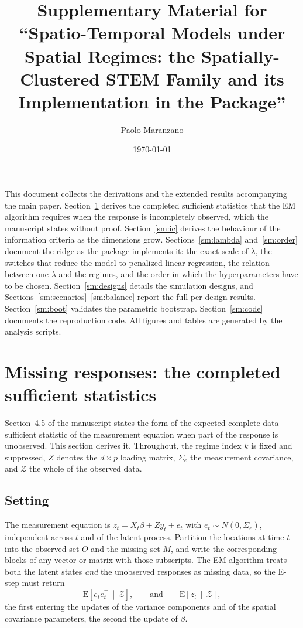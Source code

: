 \documentclass[11pt]{article}
\title{Supplementary Material for\\
       ``Spatio-Temporal Models under Spatial Regimes: the Spatially-Clustered
       STEM Family and its Implementation in the \Stem{} \Rlang{} Package''}
\author{Paolo Maranzano}
\date{\today}
\begin{document}
\maketitle

\noindent This document collects the derivations and the extended results accompanying the main paper. Section~\ref{sm:missing} derives the completed sufficient statistics that the EM algorithm requires when the response is incompletely observed, which the manuscript states without proof. Section~\ref{sm:ic} derives the behaviour of the information criteria as the dimensions grow. Sections~\ref{sm:lambda} and~\ref{sm:order} document the ridge as the package implements it: the exact scale of $\lambda$, the switches that reduce the model to penalized linear regression, the relation between one $\lambda$ and the regimes, and the order in which the hyperparameters have to be chosen. Section~\ref{sm:designs} details the simulation designs, and Sections~\ref{sm:scenarios}--\ref{sm:balance} report the full per-design results. Section~\ref{sm:boot} validates the parametric bootstrap. Section~\ref{sm:code} documents the reproduction code. All figures and tables are generated by the analysis scripts.

\section{Missing responses: the completed sufficient statistics}\label{sm:missing}

Section~4.5 of the manuscript states the form of the expected complete-data sufficient statistic of the measurement equation when part of the response is unobserved. This section derives it. Throughout, the regime index $k$ is fixed and suppressed, $Z$ denotes the $d \times p$ loading matrix, $\Sigma_e$ the measurement covariance, and $\mathcal{Z}$ the whole of the observed data.

\subsection{Setting}

The measurement equation is $z_t = X_t \beta + Z y_t + e_t$ with $e_t \sim N(0, \Sigma_e)$, independent across $t$ and of the latent process. Partition the locations at time $t$ into the observed set $O$ and the missing set $M$, and write the corresponding blocks of any vector or matrix with those subscripts. The EM algorithm treats both the latent states \emph{and} the unobserved responses as missing data, so the E-step must return
\begin{equation}\label{eq:sm:target}
  \mathrm{E}\!\left[e_t e_t^\top \,\middle|\, \mathcal{Z}\right],
  \qquad\text{and}\qquad
  \mathrm{E}\!\left[z_t \,\middle|\, \mathcal{Z}\right],
\end{equation}
the first entering the updates of the variance components and of the spatial covariance parameters, the second the update of $\beta$.
\end{document}
